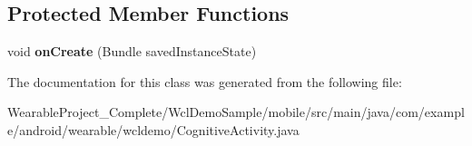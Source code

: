 \subsection*{Protected Member Functions}
\begin{DoxyCompactItemize}
\item 
void {\bfseries on\+Create} (Bundle saved\+Instance\+State)\hypertarget{classcom_1_1example_1_1android_1_1wearable_1_1wcldemo_1_1CognitiveActivity_aea3968470195eb24274d1db90be34dbd}{}\label{classcom_1_1example_1_1android_1_1wearable_1_1wcldemo_1_1CognitiveActivity_aea3968470195eb24274d1db90be34dbd}

\end{DoxyCompactItemize}


The documentation for this class was generated from the following file\+:\begin{DoxyCompactItemize}
\item 
Wearable\+Project\+\_\+\+Complete/\+Wcl\+Demo\+Sample/mobile/src/main/java/com/example/android/wearable/wcldemo/Cognitive\+Activity.\+java\end{DoxyCompactItemize}
